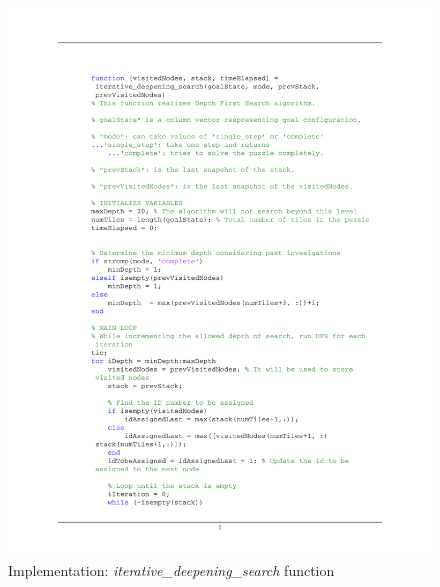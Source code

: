 \documentclass[12pt]{article}
\begin{document}
\begin{figure}[htb]
	\centering
	\includegraphics[width=1\columnwidth]{images/Code_iterative_deepening_search.pdf}
	\caption{Implementation: \textit{iterative\_deepening\_search} function}
	\label{}
\end{figure}
\end{document}
